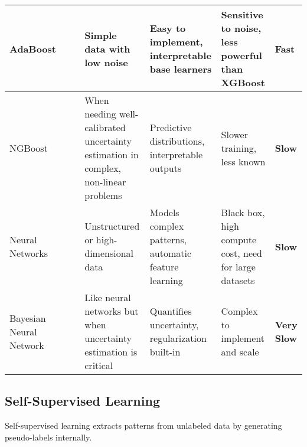 \documentclass[12pt,openany]{book}
\newcommand{\cmark}{{\color{green!60!black}\ding{51}}} %
\newcommand{\xmark}{{\color{red!80!black}\ding{55}}}   %
\begin{document}
\begin{table}[H]
{\begin{tabular}{|p{2.2cm}|c|c|p{3.5cm}|p{3cm}|p{3cm}|p{1.8cm}|}
        \hline
        AdaBoost & \cmark & \xmark & Simple data with low noise & Easy to implement, interpretable base learners & Sensitive to noise, less powerful than XGBoost & \textbf{Fast} \\
        \hline
        NGBoost & \cmark & \xmark & When needing well-calibrated uncertainty estimation in complex, non-linear problems & Predictive distributions, interpretable outputs & Slower training, less known & \textbf{Slow} \\
        \hline
        Neural Networks & \cmark & \cmark & Unstructured or high-dimensional data & Models complex patterns, automatic feature learning & Black box, high compute cost, need for large datasets & \textbf{Slow} \\
        \hline
        Bayesian Neural Network & \cmark & \cmark & Like neural networks but when uncertainty estimation is critical & Quantifies uncertainty, regularization built-in & Complex to implement and scale & \textbf{Very Slow} \\
    \end{tabular}
    }
\end{table}


\subsection{Self-Supervised Learning}

Self-supervised learning extracts patterns from unlabeled data by generating 
pseudo-labels internally.
\end{document}
